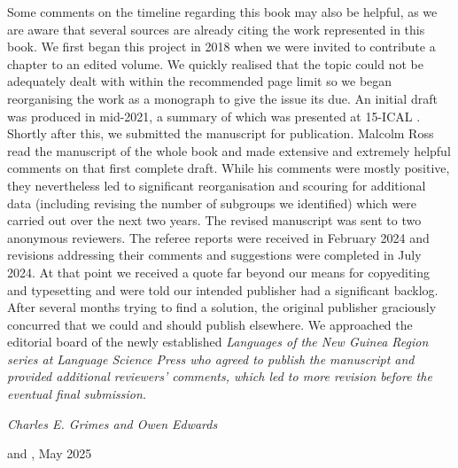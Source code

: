 Some comments on the timeline regarding this book may also be helpful,
as we are aware that several sources are already citing the work represented in this book.
We first began this project in 2018 when we were invited to contribute a chapter to an edited volume.
We quickly realised that the topic could not be adequately dealt with within the recommended
page limit so we began reorganising the work as a monograph to give the issue its due.
An initial draft was produced in mid-2021,
a summary of which was presented at 15-ICAL \citep{EdwardsGrimes2021}.
Shortly after this, we submitted the manuscript for publication.
Malcolm Ross read the manuscript of the whole book and made extensive
and extremely helpful comments on that first complete draft.
While his comments were mostly positive, they nevertheless
led to significant reorganisation
and scouring for additional data
(including revising the number of subgroups we identified)
which were carried out over the next two years.
The revised manuscript was sent to two anonymous reviewers.
The referee reports were received in February 2024 and revisions
addressing their comments and suggestions were completed in July 2024.
At that point we received a quote far beyond our means for copyediting and typesetting
and were told our intended publisher had a significant backlog.
After several months trying to find a solution,
the original publisher graciously concurred
that we could and should publish elsewhere.
We approached the editorial board of the newly
established \it{Languages of the New Guinea Region}
series at Language Science Press who agreed to publish
the manuscript and provided additional reviewers' comments,
which led to more revision before the eventual final submission.

\begin{flushright}
\it{Charles E. Grimes and Owen Edwards}

 and , May 2025
\end{flushright}
